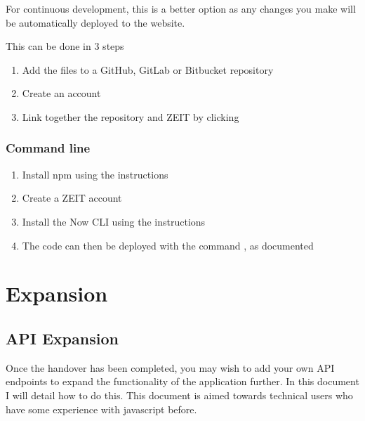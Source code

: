 \documentclass[letterpaper,10pt,english]{sphinxmanual}
\let\oldsubsection\subsection
\renewcommand{\subsection}{\needspace{6\baselineskip}\oldsubsection}
\begin{document}
For continuous development, this is a better option as any changes you
make will be automatically deployed to the website.

This can be done in 3 steps
\begin{enumerate}
%
\item {} 
Add the files to a GitHub, GitLab or Bitbucket repository

\item {} 
Create an account 

\item {} 
Link together the repository and ZEIT by clicking 

\end{enumerate}


\subsection{Command line}
\label{\detokenize{docs/Installation/frontEnd:command-line}}\begin{enumerate}
%
\item {} 
Install npm using the instructions

\item {} 
Create a ZEIT account 

\item {} 
Install the Now CLI using the instructions

\item {} 
The code can then be deployed with the command , as documented

\end{enumerate}


\chapter{Expansion}
\label{\detokenize{index:expansion}}

\section{API Expansion}
\label{\detokenize{docs/Expansion/api-expansion:api-expansion}}\label{\detokenize{docs/Expansion/api-expansion::doc}}
Once the handover has been completed, you may wish to add your own API
endpoints to expand the functionality of the application further. In
this document I will detail how to do this. This document is aimed
towards technical users who have some experience with javascript before.
\end{document}
